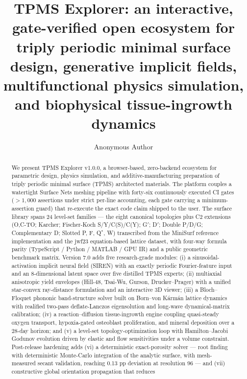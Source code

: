 \documentclass[5p,times,authoryear]{elsarticle}
\begin{document}
\begin{frontmatter}

\title{TPMS Explorer: an interactive, gate-verified open ecosystem for triply periodic
minimal surface design, generative implicit fields, multifunctional physics simulation,
and biophysical tissue-ingrowth dynamics}

\author[a]{Anonymous Author}
\address[a]{Independent Open-Source Project}

\begin{abstract}
We present TPMS Explorer v1.0.0, a browser-based, zero-backend ecosystem for parametric design,
physics simulation, and additive-manufacturing preparation of triply periodic minimal surface
(TPMS) architected materials. The platform couples a watertight Surface Nets meshing pipeline
with forty-six continuously executed CI gates ($>1{,}000$ assertions under strict per-line accounting,
each gate carrying a minimum-assertion guard) that re-execute the exact code claim
shipped to the user. The surface library spans 24 level-set families --- the eight canonical
topologies plus C2 extensions (O,C-TO; Karcher; Fischer-Koch S/Y/C(S)/C(Y); G$'$; D$'$; Double
P/D/G; Complementary D; Slotted P, F, Q$^{*}$, W) transcribed from the MiniSurf reference
implementation and the jwf23 equation-based lattice dataset, with
four-way formula parity (TypeScript / Python / MATLAB / GPU IR) and a public geometric
benchmark matrix. Version 7.0 adds five research-grade modules: (i) a sinusoidal-activation
implicit neural field (SIREN) with an exactly periodic Fourier-feature input and an 8-dimensional
latent space over five distilled TPMS experts; (ii) multiaxial anisotropic yield envelopes
(Hill-48, Tsai-Wu, Gurson, Drucker--Prager) with a unified star-convex ray-distance formulation
and an interactive 3D viewer; (iii) a Bloch--Floquet phononic band-structure solver built on
Born--von K\'arm\'an lattice dynamics with realified two-pass deflate-Lanczos eigensolution and
long-wave dynamical-matrix calibration; (iv) a reaction--diffusion tissue-ingrowth engine coupling
quasi-steady oxygen transport, hypoxia-gated osteoblast proliferation, and mineral deposition over
a 28-day horizon; and (v) a level-set topology-optimization loop with Hamilton--Jacobi Godunov
evolution driven by elastic and flow sensitivities under a volume constraint.
Post-release hardening adds (vi) a deterministic exact-porosity
solver --- root finding with deterministic Monte-Carlo integration of the analytic surface, with mesh-measured secant validation, reaching 0.13 pp
deviation at resolution 96 --- and (vii) constructive global orientation propagation that reduces

\end{abstract}
\end{frontmatter}
\end{document}
